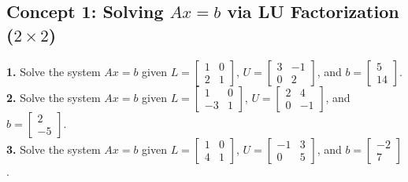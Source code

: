 \documentclass[11pt]{article}
\begin{document}
\subsection*{Concept 1: Solving $Ax = b$ via LU Factorization ($2 \times 2$)}
\textbf{1.} Solve the system $Ax = b$ given $L = \begin{bmatrix} 1 & 0 \\ 2 & 1 \end{bmatrix}$, $U = \begin{bmatrix} 3 & -1 \\ 0 & 2 \end{bmatrix}$, and $b = \begin{bmatrix} 5 \\ 14 \end{bmatrix}$. \\
\textbf{2.} Solve the system $Ax = b$ given $L = \begin{bmatrix} 1 & 0 \\ -3 & 1 \end{bmatrix}$, $U = \begin{bmatrix} 2 & 4 \\ 0 & -1 \end{bmatrix}$, and $b = \begin{bmatrix} 2 \\ -5 \end{bmatrix}$. \\
\textbf{3.} Solve the system $Ax = b$ given $L = \begin{bmatrix} 1 & 0 \\ 4 & 1 \end{bmatrix}$, $U = \begin{bmatrix} -1 & 3 \\ 0 & 5 \end{bmatrix}$, and $b = \begin{bmatrix} -2 \\ 7 \end{bmatrix}$.
\end{document}
